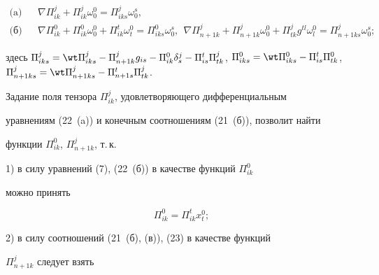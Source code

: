 \begin{equation} 


\begin{matrix} 


\text{(a)} & &


\nabla\Pi^j_{i k}+\Pi^j_{i k}\omega^0_0=\Pi^j_{i k s}\omega^s_0, \\ 


\text{(б)} & &


\nabla\Pi^0_{i k}+\Pi^0_{i k}\omega^0_0+\Pi^t_{i k}\omega^0_t= 


\Pi^0_{i k s}\omega^s_0,\ \ \nabla\Pi^j_{n+1k}+ 


\Pi^j_{n+1k}\omega^0_0+\Pi^j_{t k}g^{t l}\omega^0_l= 


\Pi^j_{n+1k s}\omega^s_0; 


\end{matrix} 


\end{equation} 


здесь $\Pi^j_{i k s}=\wt\Pi^j_{i k s}-\Pi^j_{n+1k}g_{is}- \Pi^0_{i 


k}\delta^j_s-\Pi^t_{is}\Pi^j_{t k}$, $\Pi^0_{i k s}=\wt\Pi^0_{i k 


s}-\Pi^t_{is}\Pi^0_{t k}$, $\Pi^j_{n+1k s}=\wt\Pi^j_{n+1k 


s}-\Pi^t_{n+1s}\Pi^j_{t k}$. 


 


Задание поля тензора $\Pi^j_{i k}$, удовлетворяющего дифференциальным 


уравнениям (22~(a)) и конечным соотношениям (21~(б)), позволит найти 


функции $\Pi^0_{i k}$, $\Pi^j_{n+1k}$, т.\,к. 


 


1) в силу уравнений (7), (22~(б)) в качестве функций $\Pi^0_{i k}$ 


можно принять 


\begin{equation} 


\Pi^0_{i k}=\Pi^t_{i k}x^0_t; 


\end{equation} 


 


2) в силу соотношений (21~(б), (в)), (23) в качестве функций 


$\Pi^j_{n+1k}$ следует взять 


$$ 


